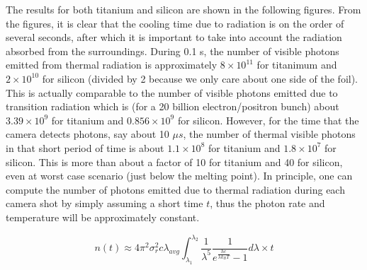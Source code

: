 \documentclass[12pt]{article}
\begin{document}
The results for both titanium and silicon are shown in the following figures. From the figures, it is clear that the cooling time due to radiation is on the order of several seconds, after which it is important to take into account the radiation absorbed from the surroundings. During 0.1 s, the number of visible photons emitted from thermal radiation is approximately $8 \times 10^{11}$ for titanimum and $2 \times 10^{10}$ for silicon (divided by 2 because we only care about one side of the foil). This is actually comparable to the number of visible photons emitted due to transition radiation which is (for a 20 billion electron/positron bunch) about $3.39 \times 10^9$ for titanium and $0.856 \times 10^9$ for silicon. However, for the time that the camera detects photons, say about 10 $\mu s$, the number of thermal visible photons in that short period of time is about $1.1 \times 10^8$ for titanium and $1.8 \times 10^7$ for silicon. This is more than about a factor of 10 for titanium and 40 for silicon, even at worst case scenario (just below the melting point). In principle, one can compute the number of photons emitted due to thermal radiation during each camera shot by simply assuming a short time $t$, thus the photon rate and temperature will be approximately constant.

\begin{equation}
n(t) \approx 4 \pi^2 \sigma_r^2 c \lambda_{avg} \int_{\lambda_1}^{\lambda_2} \frac{1}{\lambda^{5}} \frac{1}{e^{\frac{hc}{\lambda k_B T}}-1} d \lambda \times t
\end{equation}
\end{document}
